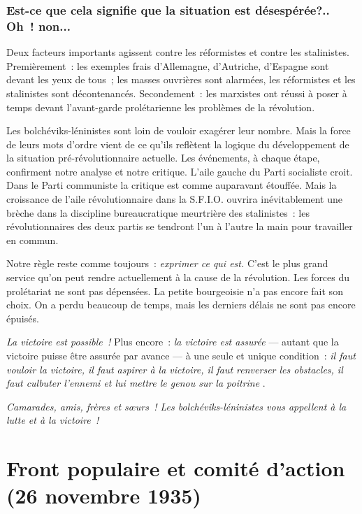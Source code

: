 \documentclass[french,twoside]{book} %
\newcommand\chapteropen{} %
\newcommand\chapterclose{} %
\begin{document}
\subsection[{Est-ce que cela signifie que la situation est désespérée?.. Oh ! non...}]{Est-ce que cela signifie que la situation est désespérée?.. Oh ! non...}
\noindent Deux facteurs importants agissent contre les réformistes et contre les stalinistes. Premièrement : les exemples frais d’Allemagne, d’Autriche, d’Espagne sont devant les yeux de tous ; les masses ouvrières sont alarmées, les réformistes et les stalinistes sont décontenancés. Secondement : les marxistes ont réussi à poser à temps devant l’avant-garde prolétarienne les problèmes de la révolution.\par
Les bolchéviks-léninistes sont loin de vouloir exagérer leur nombre. Mais la force de leurs mots d’ordre vient de ce qu’ils reflètent la logique du développement de la situation pré-révolutionnaire actuelle. Les événements, à chaque étape, confirment notre analyse et notre critique. L’aile gauche du Parti socialiste croit. Dans le Parti communiste la critique est comme auparavant étouffée. Mais la croissance de l’aile révolutionnaire dans la S.F.I.O. ouvrira inévitablement une brèche dans la discipline bureaucratique meurtrière des stalinistes : les  révolutionnaires des deux partis se tendront l’un à l’autre la main pour travailler en commun.\par
Notre règle reste comme toujours : \emph{exprimer ce qui est. }C’est le plus grand service qu’on peut rendre actuellement à la cause de la révolution. Les forces du prolétariat ne sont pas dépensées. La petite bourgeoisie n’a pas encore fait son choix. On a perdu beaucoup de temps, mais les derniers délais ne sont pas encore épuisés.\par
\emph{La victoire est possible !} Plus encore : \emph{la victoire est assurée} — autant que la victoire puisse être assurée par avance — à une seule et unique condition : \emph{il faut vouloir la victoire, il faut aspirer à la victoire, il faut renverser les obstacles, il faut culbuter l’ennemi et lui mettre le genou sur la poitrine} .\par
 \emph{Camarades, amis, frères et sœurs ! Les bolchéviks-léninistes vous appellent à la lutte et à la victoire !} 
\chapterclose


\chapteropen
 \chapter[{Front populaire et comité d’action, (26 novembre 1935)}]{Front populaire et comité d’action \\
(26 novembre 1935)}
\label{p4}\renewcommand{\leftmark}{Front populaire et comité d’action \\
(26 novembre 1935)}
\end{document}
